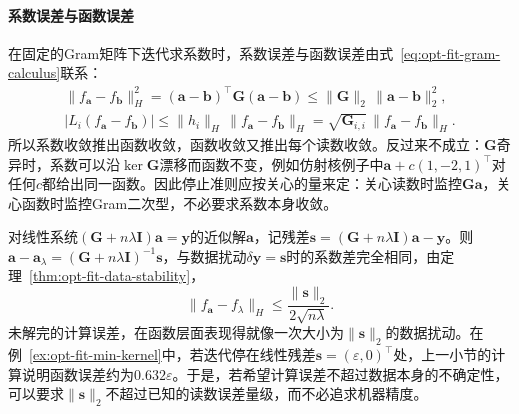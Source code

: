 \paragraph{系数误差与函数误差}
在固定的Gram矩阵下迭代求系数时，系数误差与函数误差由式~\eqref{eq:opt-fit-gram-calculus}联系：
\[
  \begin{gathered}
  \|f_{\bm a}-f_{\bm b}\|_H^2=(\bm a-\bm b)^\top\bm G(\bm a-\bm b)\le\|\bm G\|_2\,\|\bm a-\bm b\|_2^2,\\
  |L_i(f_{\bm a}-f_{\bm b})|\le\|h_i\|_H\,\|f_{\bm a}-f_{\bm b}\|_H=\sqrt{\bm G_{i,i}}\,\|f_{\bm a}-f_{\bm b}\|_H .
  \end{gathered}
\]
所以系数收敛推出函数收敛，函数收敛又推出每个读数收敛。反过来不成立：$\bm G$奇异时，系数可以沿$\ker\bm G$漂移而函数不变，例如仿射核例子中$\bm a+c(1,-2,1)^\top$对任何$c$都给出同一函数。因此停止准则应按关心的量来定：关心读数时监控$\bm G\bm a$，关心函数时监控Gram二次型，不必要求系数本身收敛。

对线性系统$(\bm G+n\lambda\bm I)\bm a=\bm y$的近似解$\bm a$，记残差$\bm s=(\bm G+n\lambda\bm I)\bm a-\bm y$。则$\bm a-\bm a_\lambda=(\bm G+n\lambda\bm I)^{-1}\bm s$，与数据扰动$\delta\bm y=\bm s$时的系数差完全相同，由定理~\ref{thm:opt-fit-data-stability}，
\[
  \|f_{\bm a}-f_\lambda\|_H\le\frac{\|\bm s\|_2}{2\sqrt{n\lambda}} .
\]
未解完的计算误差，在函数层面表现得就像一次大小为$\|\bm s\|_2$的数据扰动。在例~\ref{ex:opt-fit-min-kernel}中，若迭代停在线性残差$\bm s=(\varepsilon,0)^\top$处，上一小节的计算说明函数误差约为$0.632\varepsilon$。于是，若希望计算误差不超过数据本身的不确定性，可以要求$\|\bm s\|_2$不超过已知的读数误差量级，而不必追求机器精度。
